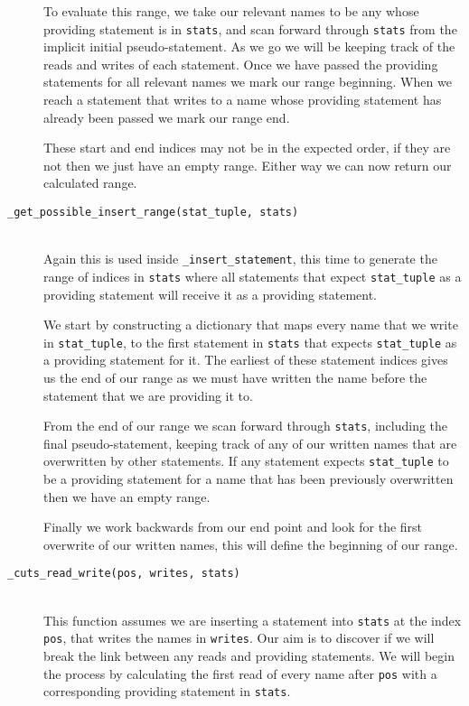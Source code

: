 \documentclass[twoside,a4paper]{report}
\begin{document}
\begin{description}
To evaluate this range, we take our relevant names to be any whose providing statement is in \texttt{stats}, and scan forward through \texttt{stats}
from the implicit initial pseudo-statement. As we go we will be keeping track of the reads and writes of each statement. Once we have passed the
providing statements for all relevant names we mark our range beginning. When we reach a statement that writes to a name whose providing statement
has already been passed we mark our range end.

These start and end indices may not be in the expected order, if they are not then we just have an empty range. Either way we can now return our calculated
range.

\item[\texttt{\_get\_possible\_insert\_range(stat\_tuple, stats)}] \hfill \\
Again this is used inside \texttt{\_insert\_statement}, this time to generate the range of indices in \texttt{stats} where all statements that expect
\texttt{stat\_tuple} as a providing statement will receive it as a providing statement. 

We start by constructing a dictionary that maps every name that we write in \texttt{stat\_tuple}, to the first statement in \texttt{stats} that expects
\texttt{stat\_tuple} as a providing statement for it. The earliest of these statement indices gives us the end of our range as we must have written the
name before the statement that we are providing it to.

From the end of our range we scan forward through \texttt{stats}, including the final pseudo-statement, keeping track of any of our written names that
are overwritten by other statements. If any statement expects \texttt{stat\_tuple} to be a providing statement for a name that has been previously
overwritten then we have an empty range.

Finally we work backwards from our end point and look for the first overwrite of our written names, this will define the beginning of our range.

\item[\texttt{\_cuts\_read\_write(pos, writes, stats)}] \hfill \\
This function assumes we are inserting a statement into \texttt{stats} at the index \texttt{pos}, that writes the names in \texttt{writes}. Our aim is
to discover if we will break the link between any reads and providing statements. We will begin the process by calculating the first read of every name
after \texttt{pos} with a corresponding providing statement in \texttt{stats}.


\end{description}
\end{document}

